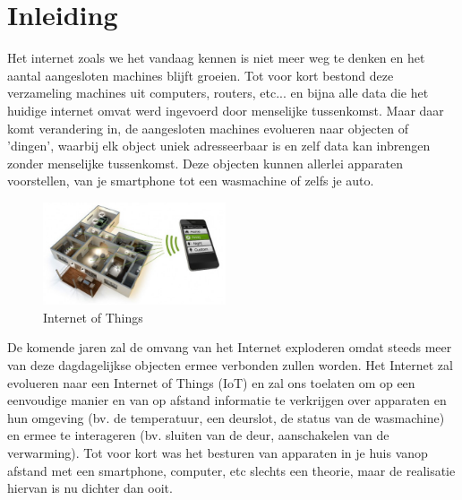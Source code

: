 \chapter{Inleiding}

Het internet zoals we het vandaag kennen is niet meer weg te denken en het aantal aangesloten machines blijft groeien. Tot voor kort bestond deze verzameling machines uit computers, routers, etc... en bijna alle data die het huidige internet omvat werd ingevoerd door menselijke tussenkomst.
Maar daar komt verandering in, de aangesloten machines evolueren naar objecten of 'dingen', waarbij elk object uniek adresseerbaar is en zelf data kan inbrengen zonder menselijke tussenkomst. Deze objecten kunnen allerlei apparaten voorstellen, van je smartphone tot een wasmachine of zelfs je auto.\\

\begin{figure}
\vspace{-10pt}
\includegraphics[width=0.48\textwidth]{fig/InternetOfThings}
\vspace{-10pt}
\caption{Internet of Things}
\vspace{-10pt}
\end{figure}
De komende jaren zal de omvang van het Internet exploderen omdat steeds meer van deze dagdagelijkse objecten ermee verbonden zullen worden. Het Internet zal evolueren naar een Internet of Things (IoT) en zal ons toelaten om op een eenvoudige manier en van op afstand informatie te verkrijgen over apparaten en hun omgeving (bv. de temperatuur, een deurslot, de status van de wasmachine) en ermee te interageren (bv. sluiten van de deur, aanschakelen van de verwarming). Tot voor kort was het besturen van apparaten in je huis vanop afstand met een smartphone, computer, etc slechts een theorie, maar de realisatie hiervan is nu dichter dan ooit.


